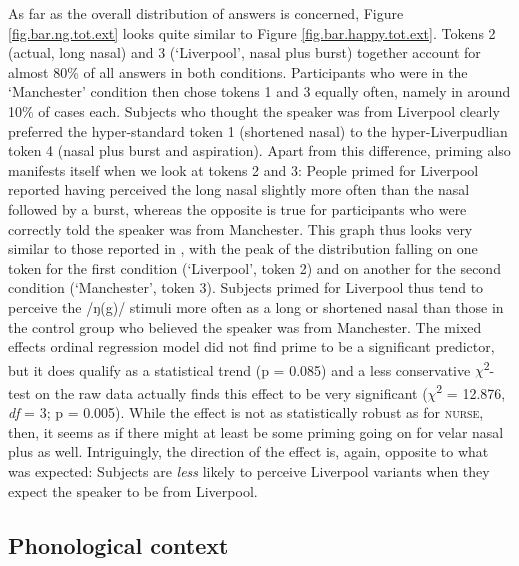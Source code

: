 As far as the overall distribution of answers is concerned, Figure \ref{fig.bar.ng.tot.ext} looks quite similar to Figure \ref{fig.bar.happy.tot.ext}.
Tokens 2 (actual, long nasal) and 3 (`Liverpool', nasal plus burst) together account for almost 80\% of all answers in both conditions.
Participants who were in the `Manchester' condition then chose tokens 1 and 3 equally often, namely in around 10\% of cases each.
Subjects who thought the speaker was from Liverpool clearly preferred the hyper-standard token 1 (shortened nasal) to the hyper-Liverpudlian token 4 (nasal plus burst and aspiration).
Apart from this difference, priming also manifests itself when we look at tokens 2 and 3: People primed for Liverpool reported having perceived the long nasal slightly more often than the nasal followed by a burst, whereas the opposite is true for participants who were correctly told the speaker was from Manchester.
This graph thus looks very similar to those reported in \textcite{hayetal2006a, haydrager2010}, with the peak of the distribution falling on one token for the first condition (`Liverpool', token 2) and on another for the second condition (`Manchester', token 3).
Subjects primed for Liverpool thus tend to perceive the /ŋ(g)/ stimuli more often as a long or shortened nasal than those in the control group who believed the speaker was from Manchester.
The mixed effects ordinal regression model did not find prime to be a significant predictor, but it does qualify as a statistical trend (p = 0.085) and a less conservative \(\chi\)\textsuperscript{2}-test on the raw data actually finds this effect to be very significant (\(\chi\)\textsuperscript{2} = 12.876, \emph{df} = 3; p = 0.005).
While the effect is not as statistically robust as for \textsc{nurse}, then, it seems as if there might at least be some priming going on for velar nasal plus as well.
Intriguingly, the direction of the effect is, again, opposite to what was expected: Subjects are \emph{less} likely to perceive Liverpool variants when they expect the speaker to be from Liverpool.

\subsection{Phonological context}
\label{sec.perc_res.ng.phon}

